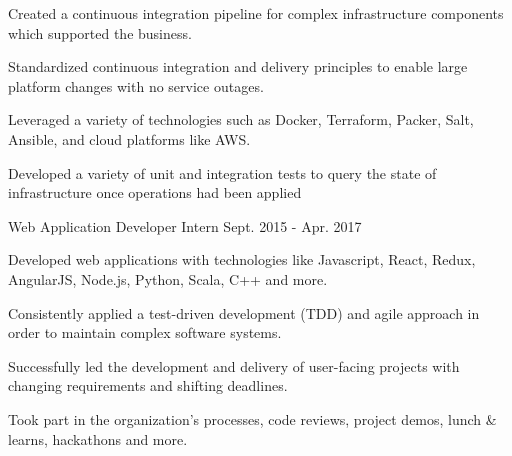 \begin{cventries}
{\begin{cvitems}
      \item \small Created a continuous integration pipeline for complex infrastructure components which supported the business.
      \item \small Standardized continuous integration and delivery principles to enable large platform changes with no service outages.
      \item \small Leveraged a variety of technologies such as Docker, Terraform, Packer, Salt, Ansible, and cloud platforms like AWS.
      \item \small Developed a variety of unit and integration tests to query the state of infrastructure once operations had been applied
      \end{cvitems}
    }
  \cventry
  {\small Web Application Developer Intern} %
  {} %
  {} %
  {\small Sept. 2015 - Apr. 2017 } %
    {
      \begin{cvitems} %
      \item \small Developed web applications with technologies like Javascript, React, Redux, AngularJS, Node.js, Python, Scala, C++ and more.
      \item \small Consistently applied a test-driven development (TDD) and agile approach in order to maintain complex software systems.
      \item \small Successfully led the development and delivery of user-facing projects with changing requirements and shifting deadlines.
      \item \small Took part in the organization's processes, code reviews, project demos, lunch \& learns, hackathons and more.
      \end{cvitems}
    }
\end{cventries}
